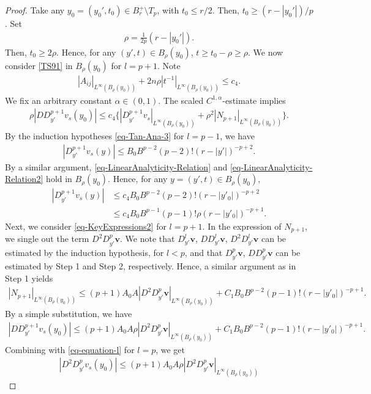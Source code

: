 \documentclass[11pt,reqno]{amsart}
\renewcommand{\leq}{\leqslant}
\renewcommand{\geq}{\geqslant}
\theoremstyle{definition}
\numberwithin{equation}{section}
\begin{document}
\begin{proof}
Take any $y_0=(y_0', t_0)\in B^+_r\setminus T_p$, with $t_0\leq r/2$. Then, $t_0\geq  (r-|y_0'|)/p$. 
Set 
\begin{align}\rho=\frac{1}{2p}(r-|y_0'|).\end{align}
Then, $t_0\geq  2\rho$. Hence, for any $(y',t)\in B_\rho(y_0)$, $t\geq  t_0-\rho\geq  \rho$. 
We now consider \eqref{TS91} in $B_{\rho}(y_0)$ for $l=p+1$. 
Note 
\begin{align}|A_{ij}|_{L^\infty(B_{\rho}(y_0))}
+2n\rho\left|t^{-1}\right|_{L^\infty(B_{\rho}(y_0))}
\leq c_4.\end{align}
We  fix an arbitrary constant $\alpha\in(0,1)$. 
The scaled $C^{1,\alpha}$-estimate implies 
\begin{align}\rho|DD_{y'}^{p+1}v_s(y_0)|\leq c_4\big\{|D_{y'}^{p+1}v_s|_{L^\infty(B_\rho(y_0))}
+\rho^2|N_{p+1}|_{L^\infty(B_\rho(y_0))}\big\}.\end{align}
By the induction hypotheses \eqref{eq-Tan-Ana-3} for $l=p-1$, we have 
\begin{align}|D_{y'}^{p+1}v_s(y)|\leq B_0B^{p-2}(p-2)!(r-|y'|)^{-p+2}.\end{align}
By a similar argument, \eqref{eq-LinearAnalyticity-Relation}
and \eqref{eq-LinearAnalyticity-Relation2} hold in $B_\rho(y_0)$. 
Hence, for any $y=(y',t)\in B_\rho(y_0)$, 
\begin{align}|D_{y'}^{p+1}v_s(y)|&\leq c_4B_0B^{p-2}(p-2)!(r-|y'_0|)^{-p+2}\\
&\leq c_4B_0B^{p-1}(p-1)!\rho(r-|y'_0|)^{-p+1}.\end{align}
Next, we consider \eqref{eq-KeyExpressions2} for $l=p+1$. 
In the expression of $N_{p+1}$, we single out the term $D^2D_{y'}^{p}\mathbf v$. We note that 
$D_{y'}^l\mathbf v$, $DD_{y'}^l\mathbf v$, $D^2D_{y'}^l\mathbf v$ can be estimated by the induction hypothesis, for $l<p$, 
and that $D_{y'}^p\mathbf v$, $DD_{y'}^p\mathbf v$ can be estimated by Step 1 and Step 2, respectively. 
Hence, a similar argument as in Step 1 yields 
\begin{align}|N_{p+1}|_{L^\infty(B_\rho(y_0))}\leq (p+1)A_0A|D^2D_{y'}^{p}\mathbf v|_{L^\infty(B_\rho(y_0))}
+C_1 B_0B^{p-2}(p-1)!(r-|y'_0|)^{-p+1}.\end{align}
By a simple substitution, we have 
\begin{align}|DD_{y'}^{p+1}v_s(y_0)|\leq (p+1)A_0A\rho|D^2D_{y'}^{p}\mathbf v|_{L^\infty(B_\rho(y_0))}
+C_1 B_0B^{p-2}(p-1)!(r-|y'_0|)^{-p+1}.\end{align}
Combining with \eqref{eq-equation-l} for $l=p$, we get 
\begin{align}|D^2D_{y'}^{p}v_s(y_0)|\leq (p+1)A_0A\rho|D^2D_{y'}^{p}\mathbf v|_{L^\infty(B_\rho(y_0))}

\end{align}
\end{proof}
\end{document}
